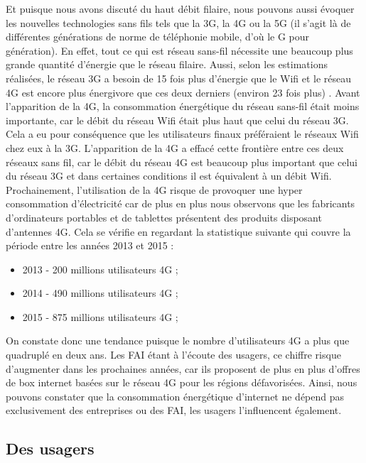 \documentclass[a4paper,twocolumn,12pt]{article}
\begin{document}
	Et puisque nous avons discuté du haut débit filaire, nous pouvons aussi évoquer les nouvelles technologies sans fils tels que la 3G, la 4G ou la 5G (il s'agit là de différentes générations de norme de téléphonie mobile, d'où le G pour génération). En effet, tout ce qui est réseau sans-fil nécessite une beaucoup plus grande quantité d'énergie que le réseau filaire. Aussi, selon les estimations réalisées, le réseau 3G a besoin de 15 fois plus d'énergie que le Wifi et le réseau 4G est encore plus énergivore que ces deux derniers (environ 23 fois plus) \cite{4}. Avant l’apparition de la 4G, la consommation énergétique du réseau sans-fil était moins importante, car le débit du réseau Wifi était plus haut que celui du réseau 3G. Cela a eu pour conséquence que les utilisateurs finaux préféraient le réseaux Wifi chez eux à la 3G. L’apparition de la 4G a effacé cette frontière entre ces deux réseaux sans fil, car le débit  du réseau 4G  est beaucoup plus important que celui du réseau 3G et dans certaines conditions il est équivalent à un débit Wifi. Prochainement, l’utilisation de la 4G risque de provoquer une hyper consommation d'électricité car de plus en plus nous observons que les fabricants d'ordinateurs portables et de tablettes présentent des produits disposant d’antennes 4G. Cela se vérifie en regardant la statistique suivante qui couvre la période entre les années 2013 et 2015 \cite{4} :
	
\begin{itemize}	
	\item 2013 - 200 millions utilisateurs 4G ;
	\item 2014 - 490 millions utilisateurs 4G ;
	\item 2015 - 875 millions utilisateurs 4G ;
\end{itemize}

	\indent On constate donc une tendance puisque le nombre d’utilisateurs 4G a plus que quadruplé en deux ans. Les FAI étant à l'écoute des usagers, ce chiffre risque d’augmenter dans les prochaines années, car ils proposent de plus en plus d’offres de box internet basées sur le réseau 4G pour les régions défavorisées. Ainsi, nous pouvons constater que la consommation énergétique d’internet ne dépend pas exclusivement des entreprises ou des FAI, les usagers l’influencent également.


\subsection{Des usagers}
	
\end{document}
